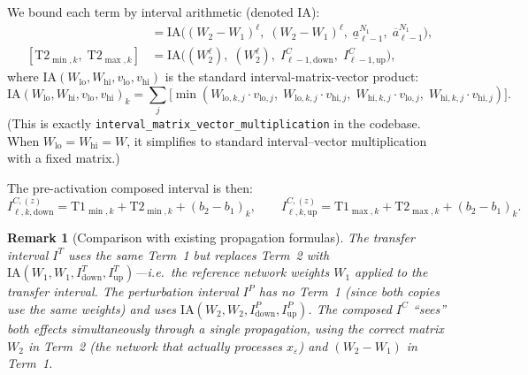 \documentclass[11pt]{article}
\newcommand{\layerl}{\ell}
\newtheorem{remark}{Remark}
\begin{document}
We bound each term by interval arithmetic (denoted $\mathrm{IA}$):
\begin{align}
    [\text{T1}_{\min,k},\; \text{T1}_{\max,k}]
    &= \mathrm{IA}\!\bigl(
        (W_2 - W_1)^\layerl,\;(W_2 - W_1)^\layerl,\;
        \underline{a}^{N_1}_{\layerl-1},\;
        \overline{a}^{N_1}_{\layerl-1}
    \bigr), \label{eq:ic_term1}\\[3pt]
    [\text{T2}_{\min,k},\; \text{T2}_{\max,k}]
    &= \mathrm{IA}\!\bigl(
        (W_2^\layerl),\;(W_2^\layerl),\;
        I^C_{\layerl-1,\mathrm{down}},\;
        I^C_{\layerl-1,\mathrm{up}}
    \bigr), \label{eq:ic_term2}
\end{align}
where $\mathrm{IA}(W_{\text{lo}}, W_{\text{hi}}, v_{\text{lo}}, v_{\text{hi}})$
is the standard interval-matrix-vector product:
\begin{equation}
    \mathrm{IA}(W_{\text{lo}}, W_{\text{hi}}, v_{\text{lo}}, v_{\text{hi}})_k
    = \sum_j \bigl[\min(W_{\text{lo},k,j}\cdot v_{\text{lo},j},\;
                         W_{\text{lo},k,j}\cdot v_{\text{hi},j},\;
                         W_{\text{hi},k,j}\cdot v_{\text{lo},j},\;
                         W_{\text{hi},k,j}\cdot v_{\text{hi},j})\bigr].
    \label{eq:ia_def}
\end{equation}
(This is exactly \texttt{interval\_matrix\_vector\_multiplication} in the codebase.
When $W_{\text{lo}} = W_{\text{hi}} = W$, it simplifies to standard
interval--vector multiplication with a fixed matrix.)

The pre-activation composed interval is then:
\begin{equation}
    \boxed{
    I^{C,(z)}_{\layerl,k,\mathrm{down}} = \text{T1}_{\min,k} + \text{T2}_{\min,k} + (b_2 - b_1)_k,
    \qquad
    I^{C,(z)}_{\layerl,k,\mathrm{up}} = \text{T1}_{\max,k} + \text{T2}_{\max,k} + (b_2 - b_1)_k.
    }
    \label{eq:ic_linear_result}
\end{equation}

\begin{remark}[Comparison with existing propagation formulas]
The transfer interval $I^T$ uses the same Term~1 but replaces Term~2 with
$\mathrm{IA}(W_1, W_1, I^T_{\mathrm{down}}, I^T_{\mathrm{up}})$---i.e.\ the
\emph{reference} network weights $W_1$ applied to the transfer interval.
The perturbation interval $I^P$ has no Term~1 (since both copies use the
same weights) and uses $\mathrm{IA}(W_2, W_2, I^P_{\mathrm{down}}, I^P_{\mathrm{up}})$.
The composed $I^C$ ``sees'' both effects simultaneously through a single
propagation, using the correct matrix $W_2$ in Term~2 (the network that
actually processes $x_\varepsilon$) and $(W_2 - W_1)$ in Term~1.
\end{remark}
\end{document}
